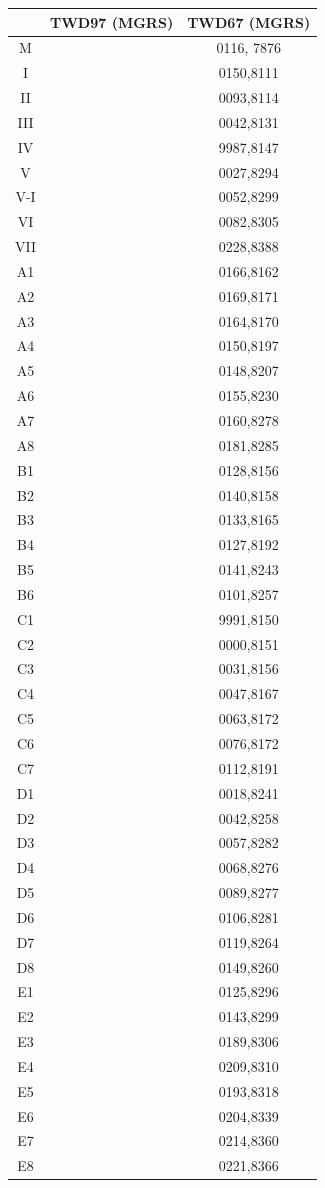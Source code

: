 \documentclass{article}
\begin{document}
\begin{multicols}{2}
\begin{tabular}{|c|c|c|}
	\hline
	& TWD97 (MGRS) & TWD67 (MGRS)\\  
	\hline
	M & & 0116, 7876\\ 
	\hline
	I & & 0150,8111\\
	II & & 0093,8114\\
	III & & 0042,8131\\
	IV & & 9987,8147\\
	V & & 0027,8294\\
	V-I & & 0052,8299\\
	VI & & 0082,8305\\
	VII & & 0228,8388\\
	\hline
	A1 & & 0166,8162\\
	A2 & & 0169,8171\\
	A3 & & 0164,8170\\
	A4 & & 0150,8197\\
	A5 & & 0148,8207\\
	A6 & & 0155,8230\\
	A7 & & 0160,8278\\
	A8 & & 0181,8285\\
	\hline
	B1 & & 0128,8156\\
	B2 & & 0140,8158\\
	B3 & & 0133,8165\\
	B4 & & 0127,8192\\
	B5 & & 0141,8243\\
	B6 & & 0101,8257\\
	\hline
	C1 & & 9991,8150\\
	C2 & & 0000,8151\\
	C3 & & 0031,8156\\
	C4 & & 0047,8167\\
	C5 & & 0063,8172\\
	C6 & & 0076,8172\\
	C7 & & 0112,8191\\
	\hline
	D1 & & 0018,8241\\
	D2 & & 0042,8258\\
	D3 & & 0057,8282\\
	D4 & & 0068,8276\\
	D5 & & 0089,8277\\
	D6 & & 0106,8281\\
	D7 & & 0119,8264\\
	D8 & & 0149,8260\\
	\hline
	E1 & & 0125,8296\\
	E2 & & 0143,8299\\
	E3 & & 0189,8306\\
	E4 & & 0209,8310\\
	E5 & & 0193,8318\\
	E6 & & 0204,8339\\
	E7 & & 0214,8360\\
	E8 & & 0221,8366\\
	\hline
\end{tabular}
\end{multicols}
\end{document}

